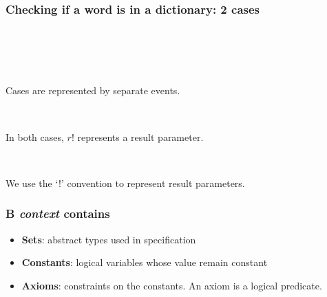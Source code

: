 \documentclass{beamer}
\begin{document}
\begin{frame}

\frametitle{Checking if a word is in a dictionary: 2 cases }



\begin{columns}
\begin{column}{2in}
\end{column}
\begin{column}{2in}
\end{column}
\end{columns}

~

~

Cases are represented by \alert{separate events}.

~

In both cases, $r!$ represents a \alert{result parameter}.

~

We use the `!' convention to represent result parameters.




\end{frame}




\begin{frame}

\frametitle{B \textit{context} contains}
\begin{itemize} \setlength{\itemsep}{6pt}
\item \textbf{Sets}:    abstract types used in specification
\item \textbf{Constants}: logical variables whose value remain constant
\item \textbf{Axioms}: constraints on the constants.  An axiom is a logical predicate.
\end{itemize}


\end{frame}
\end{document}
